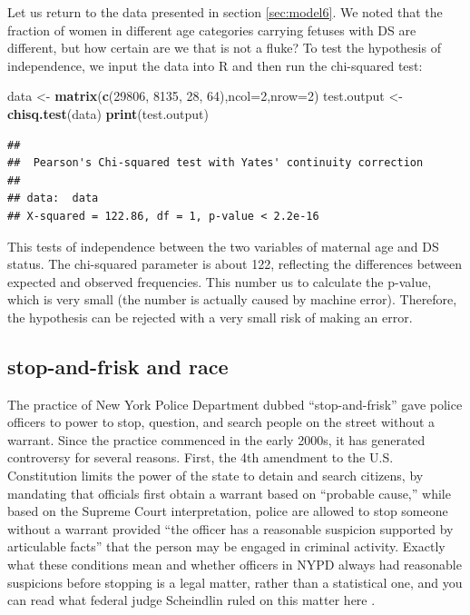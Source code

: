 \documentclass[
]{book}
\newenvironment{Shaded}{\begin{snugshade}}{\end{snugshade}}
\newcommand{\DataTypeTok}[1]{\textcolor[rgb]{0.13,0.29,0.53}{#1}}
\newcommand{\DecValTok}[1]{\textcolor[rgb]{0.00,0.00,0.81}{#1}}
\newcommand{\KeywordTok}[1]{\textcolor[rgb]{0.13,0.29,0.53}{\textbf{#1}}}
\newcommand{\NormalTok}[1]{#1}
\newcommand{\StringTok}[1]{\textcolor[rgb]{0.31,0.60,0.02}{#1}}
\theoremstyle{definition}
\theoremstyle{definition}
\theoremstyle{definition}
\theoremstyle{remark}
\begin{document}
Let us return to the data presented in section \ref{sec:model6}. We noted that the fraction of women in different age categories carrying fetuses with DS are different, but how certain are we that is not a fluke? To test the hypothesis of independence, we input the data into R and then run the chi-squared test:

\begin{Shaded}
\begin{Highlighting}[]
\NormalTok{data \textless{}{-}}\StringTok{ }\KeywordTok{matrix}\NormalTok{(}\KeywordTok{c}\NormalTok{(}\DecValTok{29806}\NormalTok{, }\DecValTok{8135}\NormalTok{, }\DecValTok{28}\NormalTok{, }\DecValTok{64}\NormalTok{),}\DataTypeTok{ncol=}\DecValTok{2}\NormalTok{,}\DataTypeTok{nrow=}\DecValTok{2}\NormalTok{)}
\NormalTok{test.output \textless{}{-}}\StringTok{ }\KeywordTok{chisq.test}\NormalTok{(data)}
\KeywordTok{print}\NormalTok{(test.output)}
\end{Highlighting}
\end{Shaded}

\begin{verbatim}
## 
##  Pearson's Chi-squared test with Yates' continuity correction
## 
## data:  data
## X-squared = 122.86, df = 1, p-value < 2.2e-16
\end{verbatim}

This tests of independence between the two variables of maternal age and DS status. The chi-squared parameter is about 122, reflecting the differences between expected and observed frequencies. This number us to calculate the p-value, which is very small (the number is actually caused by machine error). Therefore, the hypothesis can be
rejected with a very small risk of making an error.

\hypertarget{stop-and-frisk-and-race}{%
\subsection{stop-and-frisk and race}\label{stop-and-frisk-and-race}}

The practice of New York Police Department dubbed ``stop-and-frisk'' gave police officers to power to stop, question, and search people on the street without a warrant. Since the practice commenced in the early 2000s, it has generated controversy for several reasons. First, the 4th amendment to the U.S. Constitution limits the power of the state to detain and search citizens, by mandating that officials first obtain a warrant based on ``probable cause,'' while based on the Supreme Court interpretation, police are allowed to stop someone without a warrant provided ``the officer has a reasonable suspicion supported by articulable facts'' that the person may be engaged in criminal activity. Exactly what these conditions mean and whether officers in NYPD always had reasonable suspicions before stopping is a legal matter, rather than a statistical one, and you can read what federal judge Scheindlin ruled on this matter here \citep{_stop-and-frisk_????}.
\end{document}
